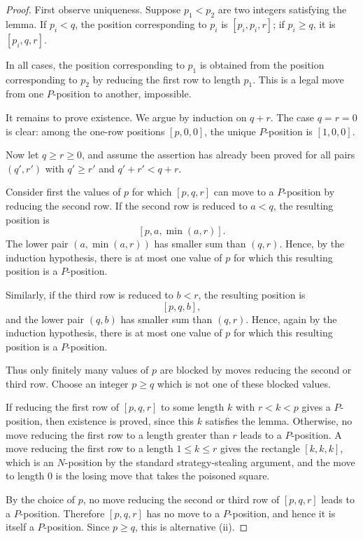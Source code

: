 \documentclass[11pt]{article}
\begin{document}
\begin{proof}
First observe uniqueness. Suppose $p_1<p_2$ are two integers satisfying the
lemma. If $p_i<q$, the position corresponding to $p_i$ is $[p_i,p_i,r]$; if
$p_i\ge q$, it is $[p_i,q,r]$.

In all cases, the position corresponding to $p_1$ is obtained from the
position corresponding to $p_2$ by reducing the first row to length $p_1$.
This is a legal move from one $P$-position to another, impossible.

It remains to prove existence. We argue by induction on $q+r$. The case
$q=r=0$ is clear: among the one-row positions $[p,0,0]$, the unique
$P$-position is $[1,0,0]$.

Now let $q\ge r\ge 0$, and assume the assertion has already been proved for
all pairs $(q',r')$ with $q'\ge r'$ and $q'+r'<q+r$.

Consider first the values of $p$ for which $[p,q,r]$ can move to a
$P$-position by reducing the second row. If the second row is reduced to
$a<q$, the resulting position is
\[
        [p,a,\min(a,r)].
\]
The lower pair $(a,\min(a,r))$ has smaller sum than $(q,r)$. Hence, by the
induction hypothesis, there is at most one value of $p$ for which this
resulting position is a $P$-position.

Similarly, if the third row is reduced to $b<r$, the resulting position is
\[
        [p,q,b],
\]
and the lower pair $(q,b)$ has smaller sum than $(q,r)$. Hence, again by the
induction hypothesis, there is at most one value of $p$ for which this
resulting position is a $P$-position.

Thus only finitely many values of $p$ are blocked by moves reducing the
second or third row. Choose an integer $p\ge q$ which is not one of these
blocked values.

If reducing the first row of $[p,q,r]$ to some length $k$ with $r<k<p$
gives a $P$-position, then existence is proved, since this $k$ satisfies the
lemma. Otherwise, no move reducing the first row to a length greater than
$r$ leads to a $P$-position. A move reducing the first row to a length
$1\le k\le r$ gives the rectangle $[k,k,k]$, which is an $N$-position by the
standard strategy-stealing argument, and the move to length $0$ is the losing
move that takes the poisoned square.

By the choice of $p$, no move reducing the second or third row of $[p,q,r]$
leads to a $P$-position. Therefore $[p,q,r]$ has no move to a $P$-position,
and hence it is itself a $P$-position. Since $p\ge q$, this is alternative
(ii).
\end{proof}
\end{document}
